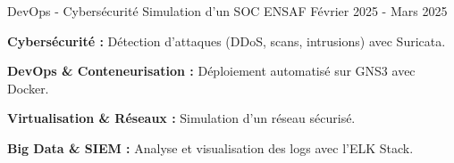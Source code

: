 \begin{cventries}
  \cventry
    {DevOps - Cybersécurité} 
    {Simulation d’un SOC} %
    {ENSAF} %
    {Février 2025 - Mars 2025} %
    {
      \begin{cvitems} %
        \item {
         \textbf{Cybersécurité :}
         Détection d’attaques (DDoS, scans, intrusions) avec Suricata.}
        \item {
        \textbf{DevOps \& Conteneurisation :}
         Déploiement automatisé sur GNS3 avec Docker.}
        \item {
        \textbf{Virtualisation \& Réseaux :}
         Simulation d’un réseau sécurisé.}
        \item {
        \textbf{Big Data \& SIEM :}
         Analyse et visualisation des logs avec l’ELK Stack.}
      \end{cvitems}
    }

\end{cventries}

